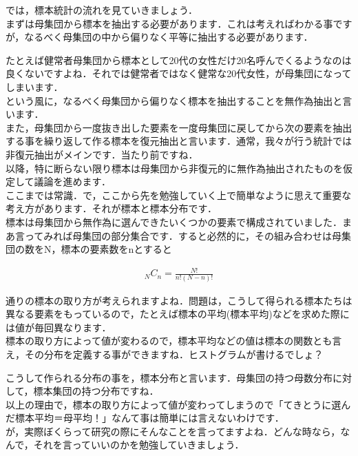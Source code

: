 \documentclass[11pt,a4paper,uplatex]{ujreport} 	%
\begin{document}
では，標本統計の流れを見ていきましょう．\\

まずは母集団から標本を抽出する必要があります．これは考えればわかる事ですが，なるべく母集団の中から偏りなく平等に抽出する必要があります．

たとえば健常者母集団から標本として20代の女性だけ20名呼んでくるようなのは良くないですよね．それでは健常者ではなく健常な20代女性，が母集団になってしまいます．\\

という風に，なるべく母集団から偏りなく標本を抽出することを無作為抽出と言います．\\

また，母集団から一度抜き出した要素を一度母集団に戻してから次の要素を抽出する事を繰り返して作る標本を復元抽出と言います．通常，我々が行う統計では非復元抽出がメインです．当たり前ですね．\\

以降，特に断らない限り標本は母集団から非復元的に無作為抽出されたものを仮定して議論を進めます．\\

ここまでは常識．で，ここから先を勉強していく上で簡単なように思えて重要な考え方があります．それが標本と標本分布です．\\

標本は母集団から無作為に選んできたいくつかの要素で構成されていました．まあ言ってみれば母集団の部分集合です．すると必然的に，その組み合わせは母集団の数をN，標本の要素数をnとすると

\begin{align}
  {}_N C_n = \frac{N!}{n!(N-n)!}
\end{align}

通りの標本の取り方が考えられますよね．問題は，こうして得られる標本たちは異なる要素をもっているので，たとえば標本の平均(標本平均)などを求めた際には値が毎回異なります．\\

標本の取り方によって値が変わるので，標本平均などの値は標本の関数とも言え，その分布を定義する事ができますね．ヒストグラムが書けるでしょ？

こうして作られる分布の事を，標本分布と言います．母集団の持つ母数分布に対して，標本集団の持つ分布ですね．\\

以上の理由で，標本の取り方によって値が変わってしまうので「てきとうに選んだ標本平均＝母平均！」なんて事は簡単には言えないわけです．\\

が，実際ぼくらって研究の際にそんなことを言ってますよね．どんな時なら，なんで，それを言っていいのかを勉強していきましょう．
\end{document}
